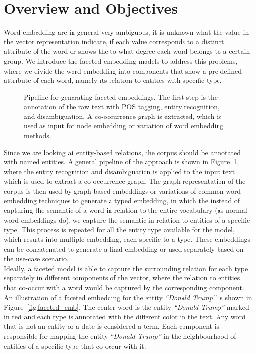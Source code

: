 \section{Overview and Objectives}\label{sec:faceted_overview}
Word embedding are in general very ambiguous, it is unknown what the value in the vector representation indicate, if each value corresponds to a distinct attribute of the word or shows the to what degree each word belongs to a certain group. We introduce the faceted embedding models to address this problems, where we divide the word embedding into components that show a pre-defined attribute of each word, namely its relation to entities with specific type. 
\begin{figure}
\centering 
\resizebox{0.97\textwidth}{0.16\textwidth}{      

}
\caption{Pipeline for generating faceted embeddings. The first step is the annotation of the raw text with POS tagging, entity recognition, and disambiguation. A co-occurrence graph is extracted, which is used as input for node embedding or variation of word embedding methods.   }
\label{fig:facetted_pipeline}
\end{figure}
Since we are looking at entity-based relations, the corpus should be annotated with named entities. A general pipeline of the approach is shown in Figure~\ref{fig:facetted_pipeline}, where the entity recognition and disambiguation is applied to the input text which is used to extract a co-occurrence graph. The graph representation of the corpus is then used by graph-based embeddings or variations of common word embedding techniques to generate a typed embedding, in which the instead of capturing the semantic of a word in relation to the entire vocabulary (as normal word embeddings do), we capture the semantic in relation to entities of a specific type. This process is repeated for all the entity type available for the model, which results into multiple embedding, each specific to a type. These embeddings can be concatenated to generate a final embedding or used separately based on the use-case scenario. \\
Ideally, a faceted model is able to capture the surrounding relation for each type separately in different components of the vector, where the relation to entities that co-occur with a word would be captured by the corresponding component. An illustration of a faceted embedding for the entity \emph{``Donald Trump''} is shown in Figure~\ref{fig:faceted_emb}. The center word is the entity \emph{``Donald Trump''} marked in red and each type is annotated with the different color in the text. Any word that is not an entity or a date is considered a term. Each component is responsible for mapping the entity \emph{``Donald Trump''} in the neighbourhood of entities of a specific type that co-occur with it. \\
